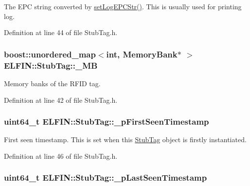 The E\-P\-C string converted by \hyperlink{class_e_l_f_i_n_1_1_stub_tag_a723f6fd0f93be388fc3e33e421971602}{set\-Log\-E\-P\-C\-Str()}. This is usually used for printing log. 



Definition at line 44 of file Stub\-Tag.\-h.

\hypertarget{class_e_l_f_i_n_1_1_stub_tag_aaf9799b7628bb9e7e809f4b1170e8860}{
\subsubsection[{\-\_\-\-M\-B}]{\setlength{\rightskip}{0pt plus 5cm}boost\-::unordered\-\_\-map$<$int, Memory\-Bank$\ast$ $>$ E\-L\-F\-I\-N\-::\-Stub\-Tag\-::\-\_\-\-M\-B}}\label{class_e_l_f_i_n_1_1_stub_tag_aaf9799b7628bb9e7e809f4b1170e8860}


Memory banks of the R\-F\-I\-D tag. 



Definition at line 42 of file Stub\-Tag.\-h.

\hypertarget{class_e_l_f_i_n_1_1_stub_tag_a64dca615c8a707c471a18603d1571827}{
\subsubsection[{\-\_\-p\-First\-Seen\-Timestamp}]{\setlength{\rightskip}{0pt plus 5cm}uint64\-\_\-t E\-L\-F\-I\-N\-::\-Stub\-Tag\-::\-\_\-p\-First\-Seen\-Timestamp}}\label{class_e_l_f_i_n_1_1_stub_tag_a64dca615c8a707c471a18603d1571827}


First seen timestamp. This is set when this \hyperlink{class_e_l_f_i_n_1_1_stub_tag}{Stub\-Tag} object is firstly instantiated. 



Definition at line 46 of file Stub\-Tag.\-h.

\hypertarget{class_e_l_f_i_n_1_1_stub_tag_aaacdb107e2932c933da9614fb720dd38}{
\subsubsection[{\-\_\-p\-Last\-Seen\-Timestamp}]{\setlength{\rightskip}{0pt plus 5cm}uint64\-\_\-t E\-L\-F\-I\-N\-::\-Stub\-Tag\-::\-\_\-p\-Last\-Seen\-Timestamp}}\label{class_e_l_f_i_n_1_1_stub_tag_aaacdb107e2932c933da9614fb720dd38}


